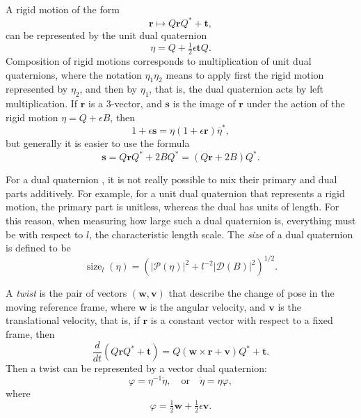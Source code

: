 \documentclass[reqno,12pt]{amsart}
\DeclareMathOperator\size{{size}}
\begin{document}
A rigid motion of the form
\begin{equation}
\label{rigid motion action}
\bm r \mapsto Q \bm r Q^* + \bm t,
\end{equation}
can be represented by the unit dual quaternion
\begin{equation}
\label{rigid motion as dual quaternion}
\eta = Q + \tfrac12 \epsilon \bm t Q.
\end{equation}
Composition of rigid motions corresponds to multiplication of unit dual quaternions, where the notation $\eta_1 \eta_2$ means to apply first the rigid motion represented by $\eta_2$, and then by $\eta_1$, that is, the dual quaternion acts by left multiplication.  If $\bm r$ is a 3-vector, and $\bm s$ is the image of $\bm r$ under the action of the rigid motion $\eta = Q + \epsilon B$, then
\begin{equation}
\label{defn of rigid motion on 3-vector}
1 + \epsilon \bm s = \eta (1 + \epsilon \bm r) \overline\eta^* ,
\end{equation}
but generally it is easier to use the formula
\begin{equation}
\label{rigid motion on 3-vector}
\bm s = Q \bm r Q^* + 2 B Q^* = (Q \bm r + 2 B) Q^* .
\end{equation}

For a dual quaternion , it is not really possible to mix their primary and dual parts additively.  For example, for a unit dual quaternion that represents a rigid motion, the primary part is unitless, whereas the dual has units of length.  For this reason, when measuring how large such a dual quaternion is, everything must be with respect to $l$, the characteristic length scale.  The \emph{size} of a dual quaternion is defined to be
\begin{equation}
\label{size}
\size_{l}(\eta) = \left(|\mathcal P(\eta)|^2 + l^{-2}|\mathcal D(B)|^2\right)^{1/2}.
\end{equation}

A \emph{twist} is the pair of vectors $(\bm w, \bm v)$ that describe the change of pose in the moving reference frame, where $\bm w$ is the angular velocity, and $\bm v$ is the translational velocity, that is, if $\bm r$ is a constant vector with respect to a fixed frame, then
\begin{equation}
\label{ode twist}
\frac d{dt} (Q \bm r Q^* + \bm t) = Q (\bm w \times \bm r + \bm v) Q^* + \bm t .
\end{equation}
Then a twist can be represented by a vector dual quaternion:
\begin{equation}
\label{ode dual quaternion}
\varphi = \eta^{-1} \dot \eta, \quad\text{or}\quad\dot \eta = \eta \varphi ,
\end{equation}
where
\begin{equation}
\label{twist as dual quaternion}
\varphi = \tfrac12 \bm w + \tfrac12 \epsilon \bm v .
\end{equation}
\end{document}
